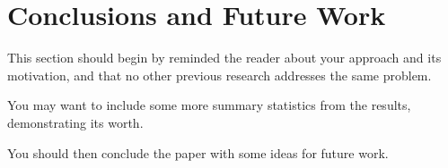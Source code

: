 \section{Conclusions and Future Work}
\label{sec:conclusions-and-future-work}

This section should begin by reminded the reader
about your approach and its motivation, and that
no other previous research addresses the same
problem.

You may want to include some more summary statistics
from the results, demonstrating its worth.

You should then conclude the paper with some ideas
for future work.